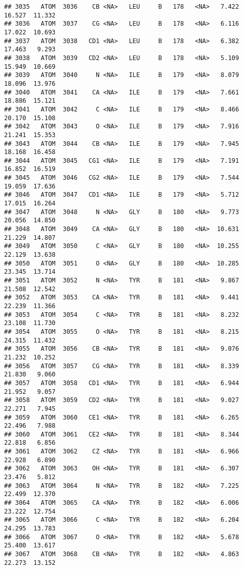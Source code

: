 \documentclass[
]{article}
\begin{document}
\begin{verbatim}
## 3035   ATOM  3036    CB <NA>   LEU     B   178   <NA>   7.422  16.527  11.332
## 3036   ATOM  3037    CG <NA>   LEU     B   178   <NA>   6.116  17.022  10.693
## 3037   ATOM  3038   CD1 <NA>   LEU     B   178   <NA>   6.382  17.463   9.293
## 3038   ATOM  3039   CD2 <NA>   LEU     B   178   <NA>   5.109  15.949  10.669
## 3039   ATOM  3040     N <NA>   ILE     B   179   <NA>   8.079  18.096  13.976
## 3040   ATOM  3041    CA <NA>   ILE     B   179   <NA>   7.661  18.886  15.121
## 3041   ATOM  3042     C <NA>   ILE     B   179   <NA>   8.466  20.170  15.108
## 3042   ATOM  3043     O <NA>   ILE     B   179   <NA>   7.916  21.241  15.353
## 3043   ATOM  3044    CB <NA>   ILE     B   179   <NA>   7.945  18.168  16.458
## 3044   ATOM  3045   CG1 <NA>   ILE     B   179   <NA>   7.191  16.852  16.519
## 3045   ATOM  3046   CG2 <NA>   ILE     B   179   <NA>   7.544  19.059  17.636
## 3046   ATOM  3047   CD1 <NA>   ILE     B   179   <NA>   5.712  17.015  16.264
## 3047   ATOM  3048     N <NA>   GLY     B   180   <NA>   9.773  20.056  14.850
## 3048   ATOM  3049    CA <NA>   GLY     B   180   <NA>  10.631  21.229  14.807
## 3049   ATOM  3050     C <NA>   GLY     B   180   <NA>  10.255  22.129  13.638
## 3050   ATOM  3051     O <NA>   GLY     B   180   <NA>  10.285  23.345  13.714
## 3051   ATOM  3052     N <NA>   TYR     B   181   <NA>   9.867  21.508  12.542
## 3052   ATOM  3053    CA <NA>   TYR     B   181   <NA>   9.441  22.239  11.366
## 3053   ATOM  3054     C <NA>   TYR     B   181   <NA>   8.232  23.108  11.730
## 3054   ATOM  3055     O <NA>   TYR     B   181   <NA>   8.215  24.315  11.432
## 3055   ATOM  3056    CB <NA>   TYR     B   181   <NA>   9.076  21.232  10.252
## 3056   ATOM  3057    CG <NA>   TYR     B   181   <NA>   8.339  21.830   9.060
## 3057   ATOM  3058   CD1 <NA>   TYR     B   181   <NA>   6.944  21.952   9.057
## 3058   ATOM  3059   CD2 <NA>   TYR     B   181   <NA>   9.027  22.271   7.945
## 3059   ATOM  3060   CE1 <NA>   TYR     B   181   <NA>   6.265  22.496   7.988
## 3060   ATOM  3061   CE2 <NA>   TYR     B   181   <NA>   8.344  22.818   6.856
## 3061   ATOM  3062    CZ <NA>   TYR     B   181   <NA>   6.966  22.928   6.890
## 3062   ATOM  3063    OH <NA>   TYR     B   181   <NA>   6.307  23.476   5.812
## 3063   ATOM  3064     N <NA>   TYR     B   182   <NA>   7.225  22.499  12.370
## 3064   ATOM  3065    CA <NA>   TYR     B   182   <NA>   6.006  23.222  12.754
## 3065   ATOM  3066     C <NA>   TYR     B   182   <NA>   6.204  24.295  13.783
## 3066   ATOM  3067     O <NA>   TYR     B   182   <NA>   5.678  25.400  13.617
## 3067   ATOM  3068    CB <NA>   TYR     B   182   <NA>   4.863  22.273  13.152

\end{verbatim}
\end{document}
